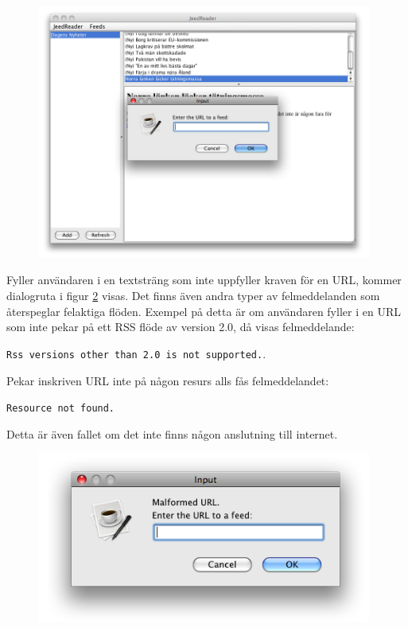 \documentclass[a4paper, 12pt]{article}
\begin{document}
\begin{figure}[H]
  \begin{center}
    \includegraphics[width=110mm]{images/add-feed.png}
    \caption{}
    \label{fig:add-feed}
  \end{center}
\end{figure}

Fyller användaren i en textsträng som inte uppfyller kraven för en
URL, kommer dialogruta i figur \ref{fig:malformed-url} visas. Det
finns även andra typer av felmeddelanden som återspeglar felaktiga
flöden. Exempel på detta är om användaren fyller i en URL som inte
pekar på ett RSS flöde av version 2.0, då visas felmeddelande:

\verb!Rss versions other than 2.0 is not supported.!.

Pekar inskriven URL inte på någon resurs alls fås felmeddelandet:

\verb!Resource not found.!

Detta är även fallet om det inte finns någon anslutning till
internet.

\begin{figure}[H]
  \begin{center}
    \includegraphics[width=110mm]{images/malformed-url.png}
    \caption{}
    \label{fig:malformed-url}
  \end{center}
\end{figure}
\end{document}
